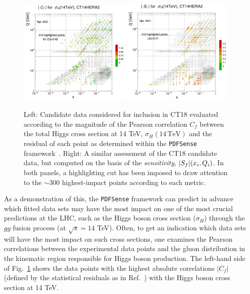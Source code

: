 \begin{figure}[tb]
	\includegraphics[width=0.48\textwidth]{./fig/Cf_higgs.pdf}
	\includegraphics[width=0.48\textwidth]{./fig/Sf_higgs.pdf}
\caption{
	Left: Candidate data considered for inclusion in CT18
	evaluated according to the magnitude of the Pearson
	correlation $C_f$ between the total Higgs cross section at 14 TeV,
	$\sigma_{H}(14\, \mathrm{TeV})$ and the residual of
	each point as determined within the \texttt{PDFSense}
	framework~\cite{Wang:2018heo}.
	Right: A similar assessment of the CT18 candidate data,
	but computed on the basis of the {\it sensitivity},
	$|S_f|(x_i,Q_i)$. In both panels, a highlighting
	cut has been imposed to draw attention to the $\sim\!300$
	highest-impact points according to each metric.
  }
\label{fig:PDFSense}
\end{figure}

As a demonstration of this, the \texttt{PDFSense} framework can predict in advance which fitted data sets may have the most impact on one of the most crucial predictions at the LHC, such as the Higgs boson cross section ($\sigma_H$) through the $gg$ fusion process (at $\sqrt{s}=14$ TeV). Often, to get an indication which data sets will have the most impact on such cross sections, one examines the Pearson correlations \cite{Pumplin:2001ct,Nadolsky:2001yg,Nadolsky:2008zw} between the experimental data points and the gluon distribution in the kinematic region responsible for Higgs boson production.  The
left-hand side of Fig.~\ref{fig:PDFSense} shows the data points with the highest absolute correlations $|C_f|$ (defined by the statistical residuals as in Ref.~\cite{Wang:2018heo}) with the Higgs boson cross section at 14 TeV. 

